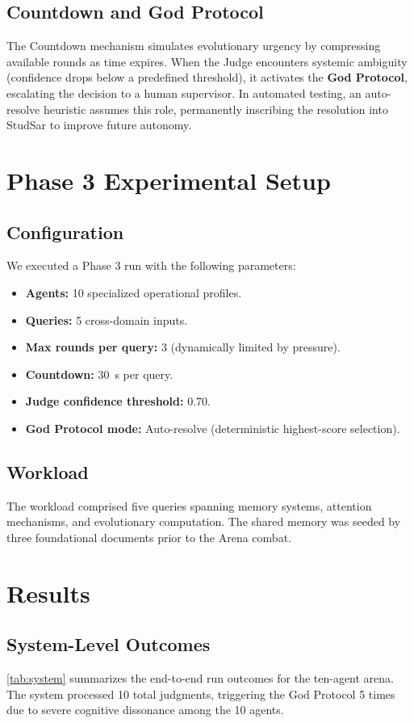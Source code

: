 \documentclass[11pt, a4paper]{article}
\begin{document}
\subsection{Countdown and God Protocol}
The Countdown mechanism simulates evolutionary urgency by compressing available rounds as time expires. When the Judge encounters systemic ambiguity (confidence drops below a predefined threshold), it activates the \textbf{God Protocol}, escalating the decision to a human supervisor. In automated testing, an auto-resolve heuristic assumes this role, permanently inscribing the resolution into StudSar to improve future autonomy.

\section{Phase 3 Experimental Setup}
\subsection{Configuration}
We executed a Phase 3 run with the following parameters:
\begin{itemize}
  \item \textbf{Agents:} 10 specialized operational profiles.
  \item \textbf{Queries:} 5 cross-domain inputs.
  \item \textbf{Max rounds per query:} 3 (dynamically limited by pressure).
  \item \textbf{Countdown:} \SI{30}{\second} per query.
  \item \textbf{Judge confidence threshold:} 0.70.
  \item \textbf{God Protocol mode:} Auto-resolve (deterministic highest-score selection).
\end{itemize}

\subsection{Workload}
The workload comprised five queries spanning memory systems, attention mechanisms, and evolutionary computation. The shared memory was seeded by three foundational documents prior to the Arena combat.

\section{Results}
\subsection{System-Level Outcomes}
\cref{tab:system} summarizes the end-to-end run outcomes for the ten-agent arena. The system processed 10 total judgments, triggering the God Protocol 5 times due to severe cognitive dissonance among the 10 agents.
\end{document}
